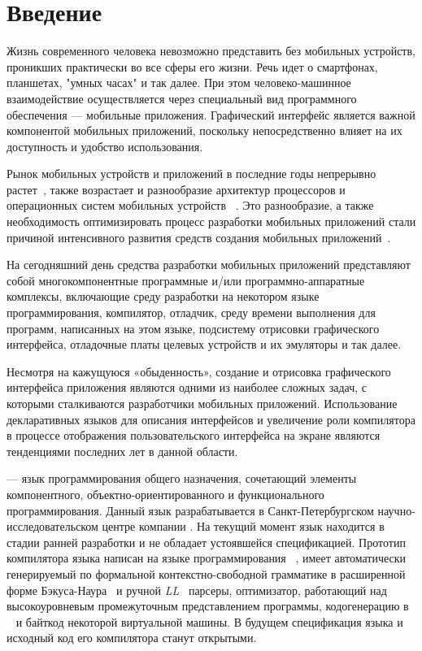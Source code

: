 \section*{Введение}
Жизнь современного человека невозможно представить без мобильных
устройств, проникших практически во все сферы его жизни. Речь идет о
смартфонах, планшетах, "умных часах" и так далее. При этом человеко-машинное
взаимодействие осуществляется через специальный вид программного обеспечения
--- мобильные приложения. Графический интерфейс является важной компонентой
мобильных приложений, поскольку непосредственно влияет на их доступность и
удобство использования.

Рынок мобильных устройств и приложений в последние годы непрерывно
растет~\cite{device-market-stat,app-download-stat}, также возрастает и
разнообразие архитектур процессоров и операционных систем мобильных
устройств ~\cite{cpu-arches, mobile-phones-cpu-trends}.
Это разнообразие, а также необходимость оптимизировать процесс разработки
мобильных приложений стали причиной интенсивного развития средств создания
мобильных приложений~\cite{mob-apps-approaches,jp-compose-homepage,swiftui-homepage,flutter-homepage, reactnative-homepage, vuenative-homepage}.

На сегодняшний день средства разработки мобильных приложений представляют
собой многокомпонентные программные и/или про\-грамм\-но-аппаратные
комплексы, включающие среду разработки на некотором языке программирования,
компилятор, отладчик, среду времени выполнения для программ, написанных на
этом языке, подсистему отрисовки графического интерфейса, отладочные платы
целевых ус\-т\-рой\-ств и их эмуляторы и так далее.

Несмотря на кажущуюся «обыденность», создание и отрисовка графического
интерфейса приложения являются одними из наиболее сложных задач, с которыми
сталкиваются разработчики мобильных приложений. Использование декларативных
языков для описания интерфейсов и увеличение роли компилятора в процессе
отображения пользовательского интерфейса на экране являются тенденциями
последних лет в данной области.

 --- язык программирования общего назначения, сочетающий
элементы компонентного, объектно-ориентированного и функционального
программирования. Данный язык разрабатывается в Санкт-Петербургском
научно-исследовательском центре компании . На текущий момент
язык находится в стадии ранней разработки и не обладает устоявшейся
спецификацией. Прототип компилятора языка написан на языке
программирования ~\cite{golang-homepage}, имеет автоматически
генерируемый по формальной контекстно-свободной грамматике в расширенной
форме Бэкуса-Наура~\cite{ebnf} и ручной \textit{LL}~\cite{llk-parsers}
парсеры, оптимизатор, работающий над высокоуровневым промежуточным
представлением программы, кодогенерацию в
~\cite{llvmir-homepage} и байткод некоторой виртуальной
машины. В будущем спецификация языка  и исходный код его
компилятора станут открытыми.

